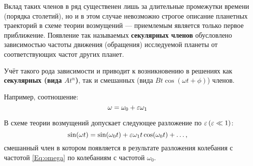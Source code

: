 Вклад таких членов в ряд существенен лишь
за длительные промежутки времени (порядка столетий),
но и в этом случае невозможно строгое описание планетных
траекторий в схеме теории возмущений ---
приемлемым является только первое приближение.
Появление так называемых \textbf{секулярных членов}
обусловлено зависимостью частоты движения (обращения)
исследуемой планеты от соответствующих частот других планет.


Учёт такого рода зависимости и
приводит к возникновению в решениях
как \textbf{секулярных (вида $A t^n$)},
так и смешанных (вида $B t \cos(\omega t + \phi)$) членов.

Например, соотношение:
\begin{equation} \label{Eq:omega}
    \omega = \omega_0 + \varepsilon \omega_1 
\end{equation}

В схеме теории возмущений допускает
следующее разложение по $\varepsilon \, (\varepsilon \ll 1)$:
\begin{equation*}
    \sin(\omega t) = \sin(\omega_0 t) +
    \varepsilon \omega_1 t \cos(\omega_0 t) + \dots,
\end{equation*}
смешанный член в котором появляется в результате разложения
колебания с частотой \eqref{Eq:omega}
по колебаниям с частотой $\omega_0$.

